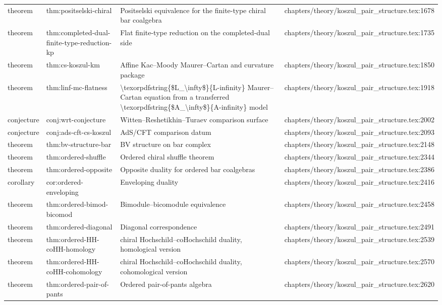 \documentclass[11pt]{article}
\begin{document}
\begin{longtable}{L{0.10\textwidth}L{0.26\textwidth}L{0.42\textwidth}L{0.22\textwidth}}
theorem & thm:positselski-chiral & Positselski equivalence for the finite-type chiral bar coalgebra & chapters/theory/koszul\_pair\_structure.tex:1678\\
theorem & thm:completed-dual-finite-type-reduction-kp & Flat finite-type reduction on the completed-dual side & chapters/theory/koszul\_pair\_structure.tex:1735\\
theorem & thm:cs-koszul-km & Affine Kac--Moody Maurer--Cartan and curvature package & chapters/theory/koszul\_pair\_structure.tex:1850\\
theorem & thm:linf-mc-flatness & \textbackslash{}texorpdfstring\{\$L\_\textbackslash{}infty\$\}\{L-infinity\} Maurer--Cartan equation from a transferred \textbackslash{}texorpdfstring\{\$A\_\textbackslash{}infty\$\}\{A-infinity\} model & chapters/theory/koszul\_pair\_structure.tex:1918\\
conjecture & conj:wrt-conjecture & Witten--Reshetikhin--Turaev comparison surface & chapters/theory/koszul\_pair\_structure.tex:2002\\
conjecture & conj:ads-cft-cs-koszul & AdS/CFT comparison datum & chapters/theory/koszul\_pair\_structure.tex:2093\\
theorem & thm:bv-structure-bar & BV structure on bar complex & chapters/theory/koszul\_pair\_structure.tex:2148\\
theorem & thm:ordered-shuffle & Ordered chiral shuffle theorem & chapters/theory/koszul\_pair\_structure.tex:2344\\
theorem & thm:ordered-opposite & Opposite duality for ordered bar coalgebras & chapters/theory/koszul\_pair\_structure.tex:2386\\
corollary & cor:ordered-enveloping & Enveloping duality & chapters/theory/koszul\_pair\_structure.tex:2416\\
theorem & thm:ordered-bimod-bicomod & Bimodule--bicomodule equivalence & chapters/theory/koszul\_pair\_structure.tex:2458\\
theorem & thm:ordered-diagonal & Diagonal correspondence & chapters/theory/koszul\_pair\_structure.tex:2491\\
theorem & thm:ordered-HH-coHH-homology & chiral Hochschild--coHochschild duality, homological version & chapters/theory/koszul\_pair\_structure.tex:2539\\
theorem & thm:ordered-HH-coHH-cohomology & chiral Hochschild--coHochschild duality, cohomological version & chapters/theory/koszul\_pair\_structure.tex:2570\\
theorem & thm:ordered-pair-of-pants & Ordered pair-of-pants algebra & chapters/theory/koszul\_pair\_structure.tex:2620\\

\end{longtable}
\end{document}
